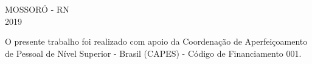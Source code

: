 \vspace{2cm}
\begin{center}
{MOSSORÓ - RN}
\\
{2019}
\end{center}
\vspace{0.2cm}
\begin{minipage}{\textwidth}
   \onehalfspacing 
   
\textcolor{thegrey}{O presente trabalho foi realizado com apoio da Coordenação de Aperfeiçoamento de Pessoal de Nível Superior - Brasil (CAPES) - Código de Financiamento 001.}
  \end{minipage}